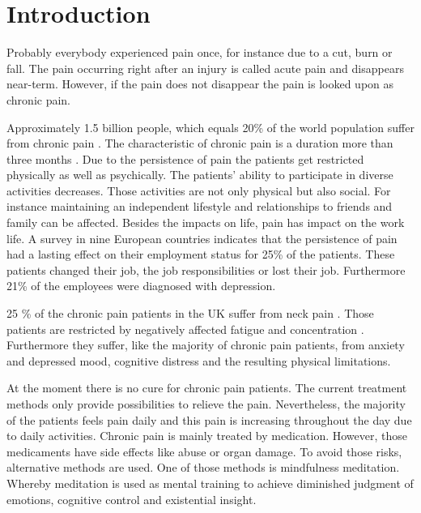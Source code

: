 \chapter{Introduction}
Probably everybody experienced pain once, for instance due to a cut, burn or fall. The pain occurring right after an injury is called acute pain and disappears near-term. However, if the pain does not disappear the pain is looked upon as chronic pain. \cite{Briggs2010,Mello2016}

Approximately 1.5 billion people, which equals 20\% of the world population suffer from chronic pain \cite{Zeidan2016,Macfarlanea2016}. The characteristic of chronic pain is a duration more than three months \cite{Mello2016}. Due to the persistence of pain the patients get restricted physically as well as psychically. 
The patients' ability to participate in diverse activities decreases. Those activities are not only physical but also social. For instance maintaining an independent lifestyle and relationships to friends and family can be affected. Besides the impacts on life, pain has impact on the work life. A survey in nine European countries  indicates that the persistence of pain had a lasting effect on their employment status for 25\% of the patients. These patients changed their job, the job responsibilities or lost their job. Furthermore  21\% of the employees were diagnosed with depression. \cite{Breivik2006} 

25 \% of the chronic pain patients in the UK suffer from neck pain \cite{Macfarlanea2016}. Those patients are restricted by negatively affected fatigue and concentration \cite{vanRanderaat2016}. Furthermore they suffer, like the majority of chronic pain patients, from anxiety and depressed mood, cognitive distress and the resulting physical limitations. \cite{gross2013}

At the moment there is no cure for chronic pain patients. The current treatment methods only provide possibilities to relieve the pain. \cite{marcus2009,pope2017} Nevertheless, the majority of the patients feels pain daily and this pain is increasing throughout the day due to daily activities. \cite{Breivik2006}
Chronic pain is mainly treated by medication. However, those medicaments have side effects like abuse or organ damage. To avoid those risks, alternative methods are used. One of those methods is mindfulness meditation. Whereby meditation is used as mental training to achieve diminished judgment of emotions, cognitive control and existential insight. \cite{Zeidan2012}

